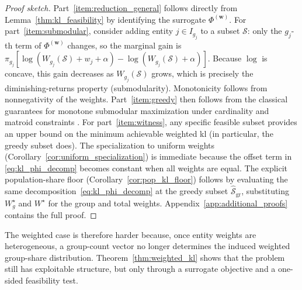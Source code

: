 \documentclass[10pt,journal]{IEEEtran}
\newcommand{\1}{\mathbf{1}}
\newcommand{\bw}{\mathbf{w}}
\newcommand{\Sel}{\mathcal{S}}
\theoremstyle{ieeethm}
\newenvironment{proofsketch}{\begin{proof}[Proof sketch]}{\end{proof}}
\begin{document}
\begin{proofsketch} \enspace
Part~\ref{item:reduction_general} follows directly from Lemma~\ref{thm:kl_feasibility} by identifying the surrogate $\Phi^{(\bw)}$. For part~\ref{item:submodular}, consider adding entity $j\in I_{g_j}$ to a subset $\Sel$: only the $g_j$-th term of $\Phi^{(\bw)}$ changes, so the marginal gain is $\pi_{g_j}[\log(W_{g_j}(\Sel)+w_j+\alpha)-\log(W_{g_j}(\Sel)+\alpha)]$. Because $\log$ is concave, this gain decreases as $W_{g_j}(\Sel)$ grows, which is precisely the diminishing-returns property (submodularity). Monotonicity follows from nonnegativity of the weights. Part~\ref{item:greedy} then follows from the classical guarantees for monotone submodular maximization under cardinality and matroid constraints \cite{fisher1978submodular,nemhauser1978submodular}. For part~\ref{item:witness}, any specific feasible subset provides an upper bound on the minimum achievable weighted \gls{kl} (in particular, the greedy subset does). The specialization to uniform weights (Corollary~\ref{cor:uniform_specialization}) is immediate because the offset term in \eqref{eq:kl_phi_decomp} becomes constant when all weights are equal. The explicit population-share floor (Corollary~\ref{cor:pop_kl_floor}) follows by evaluating the same decomposition~\eqref{eq:kl_phi_decomp} at the greedy subset $\widehat{\Sel}_{\mathrm{gr}}$, substituting $W_g^{\star}$ and $W^{\star}$ for the group and total weights. Appendix~\ref{app:additional_proofs} contains the full proof.
\end{proofsketch}

The weighted case is therefore harder because, once entity weights are heterogeneous, a group-count vector no longer determines the induced weighted group-share distribution. Theorem~\ref{thm:weighted_kl} shows that the problem still has exploitable structure, but only through a surrogate objective and a one-sided feasibility test.
\end{document}
